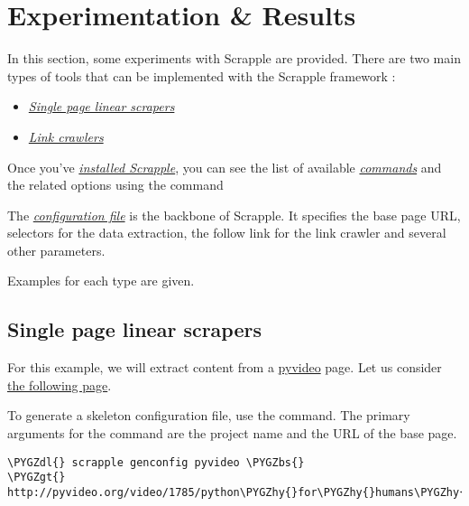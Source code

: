 \documentclass[letterpaper,12pt,english]{sphinxmanual}
\def\PYGZbs{\char`\\}
\def\PYGZgt{\char`\>}
\def\PYGZdl{\char`\$}
\def\PYGZhy{\char`\-}
\begin{document}
\chapter{Experimentation \& Results}
\label{index:experimentation-results}
In this section, some experiments with Scrapple are provided. There are two main types of tools that can be implemented with the Scrapple framework :
\begin{itemize}
\item {} 
{\hyperref[intro/tutorials/single_linear::doc]{\emph{Single page linear scrapers}}}

\item {} 
{\hyperref[intro/tutorials/link_crawler::doc]{\emph{Link crawlers}}}

\end{itemize}

Once you've {\hyperref[intro/install::doc]{\emph{installed Scrapple}}}, you can see the list of available {\hyperref[framework/commands:framework-commands]{\emph{commands}}} and the related options using the command


The {\hyperref[framework/config:framework-config]{\emph{configuration file}}} is the backbone of Scrapple. It specifies the base page URL, selectors for the data extraction, the follow link for the link crawler and several other parameters.

Examples for each type are given.


\section{Single page linear scrapers}
\label{intro/tutorials/single_linear:intro-tutorials-single-linear}\label{intro/tutorials/single_linear::doc}\label{intro/tutorials/single_linear:single-page-linear-scrapers}
For this example, we will extract content from a \href{http://pyvideo.org/}{pyvideo} page. Let us consider \href{http://pyvideo.org/video/1785/python-for-humans-1}{the following page}.

To generate a skeleton configuration file, use the  command. The primary arguments for the command are the project name and the URL of the base page.

\begin{Verbatim}[commandchars=\\\{\}]
\PYGZdl{} scrapple genconfig pyvideo \PYGZbs{}
\PYGZgt{} http://pyvideo.org/video/1785/python\PYGZhy{}for\PYGZhy{}humans\PYGZhy{}1
\end{Verbatim}
\end{document}
